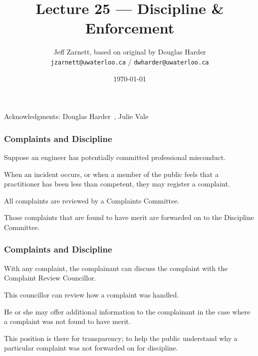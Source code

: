 

\title{Lecture 25 --- Discipline \& Enforcement}

\author{Jeff Zarnett, based on original by Douglas Harder \\ \small \texttt{jzarnett@uwaterloo.ca} / \texttt{dwharder@uwaterloo.ca}}
\date{\today}




\begin{frame}
  \titlepage

\begin{center}
  \small{Acknowledgments: Douglas Harder~\cite{dwh}, Julie Vale~\cite{jv}}
  \end{center}
\end{frame}




\begin{frame}
\frametitle{Complaints and Discipline}

Suppose an engineer has potentially committed professional misconduct.

When an incident occurs, or when a member of the public feels that a practitioner has been less than competent, they may register a complaint.

All complaints are reviewed by a Complaints Committee.

Those complaints that are found to have merit are forwarded on to the Discipline Committee.

\end{frame}



\begin{frame}
\frametitle{Complaints and Discipline}

With any complaint, the complainant can discuss the complaint with the Complaint Review Councillor.

This councillor can review how a complaint was handled.

He or she may offer additional information to the complainant in the case where a complaint was not found to have merit.

This position is there for transparency; to help the public understand why a particular complaint was not forwarded on for discipline.

\end{frame}



